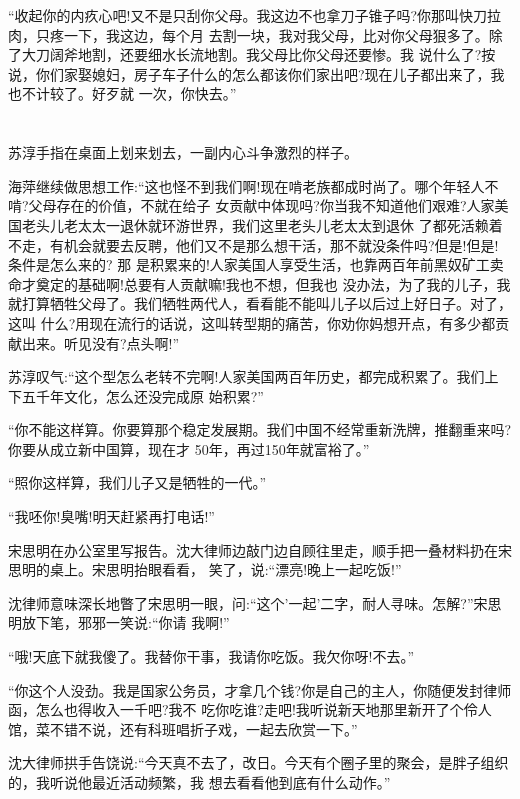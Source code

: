 \documentclass[11pt,a4paper,onecolumn]{article}
\begin{document}
``收起你的内疚心吧!又不是只刮你父母。我这边不也拿刀子锥子吗?你那叫快刀拉肉，只疼一下，我这边，每个月
去割一块，我对我父母，比对你父母狠多了。除了大刀阔斧地割，还要细水长流地割。我父母比你父母还要惨。我
说什么了?按说，你们家娶媳妇，房子车子什么的怎么都该你们家出吧?现在儿子都出来了，我也不计较了。好歹就
一次，你快去。''

\section[\thesection]{}

苏淳手指在桌面上划来划去，一副内心斗争激烈的样子。

海萍继续做思想工作:``这也怪不到我们啊!现在啃老族都成时尚了。哪个年轻人不啃?父母存在的价值，不就在给子
女贡献中体现吗?你当我不知道他们艰难?人家美国老头儿老太太一退休就环游世界，我们这里老头儿老太太到退休
了都死活赖着不走，有机会就要去反聘，他们又不是那么想干活，那不就没条件吗?但是!但是!条件是怎么来的? 那
是积累来的!人家美国人享受生活，也靠两百年前黑奴矿工卖命才奠定的基础啊!总要有人贡献嘛!我也不想，但我也
没办法，为了我的儿子，我就打算牺牲父母了。我们牺牲两代人，看看能不能叫儿子以后过上好日子。对了，这叫
什么?用现在流行的话说，这叫转型期的痛苦，你劝你妈想开点，有多少都贡献出来。听见没有?点头啊!''

苏淳叹气:``这个型怎么老转不完啊!人家美国两百年历史，都完成积累了。我们上下五千年文化，怎么还没完成原
始积累?''

``你不能这样算。你要算那个稳定发展期。我们中国不经常重新洗牌，推翻重来吗?你要从成立新中国算，现在才
50年，再过150年就富裕了。''

``照你这样算，我们儿子又是牺牲的一代。''

``我呸你!臭嘴!明天赶紧再打电话!''

宋思明在办公室里写报告。沈大律师边敲门边自顾往里走，顺手把一叠材料扔在宋思明的桌上。宋思明抬眼看看，
笑了，说:``漂亮!晚上一起吃饭!''

沈律师意味深长地瞥了宋思明一眼，问:``这个'一起'二字，耐人寻味。怎解?''宋思明放下笔，邪邪一笑说:``你请
我啊!''

``哦!天底下就我傻了。我替你干事，我请你吃饭。我欠你呀!不去。''

``你这个人没劲。我是国家公务员，才拿几个钱?你是自己的主人，你随便发封律师函，怎么也得收入一千吧?我不
吃你吃谁?走吧!我听说新天地那里新开了个伶人馆，菜不错不说，还有科班唱折子戏，一起去欣赏一下。''

沈大律师拱手告饶说:``今天真不去了，改日。今天有个圈子里的聚会，是胖子组织的，我听说他最近活动频繁，我
想去看看他到底有什么动作。''
\end{document}
